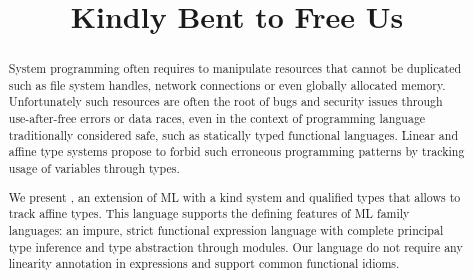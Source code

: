 \documentclass[acmsmall,review,anonymous,table]{acmart}
\begin{document}
\title{Kindly Bent to Free Us}
\begin{abstract}
  System programming often requires to manipulate resources that
  cannot be duplicated such as file system handles, network connections
  or even globally allocated memory.
  Unfortunately such resources are often the root of bugs and security issues
  through use-after-free errors or data races, even in the context
  of programming language traditionally considered safe, such as statically typed
  functional languages.
  Linear and affine type systems propose to forbid such erroneous programming
  patterns by tracking usage of variables through types.

  We present \lang, an extension of ML with a kind system and qualified
  types that allows to track affine types.
  This language supports the defining features of ML family languages:
  an impure, strict functional expression language with complete principal type
  inference and type abstraction through modules.
  Our language do not require any linearity annotation in
  expressions and support common functional idioms.
\end{abstract}


\maketitle










\end{document}
